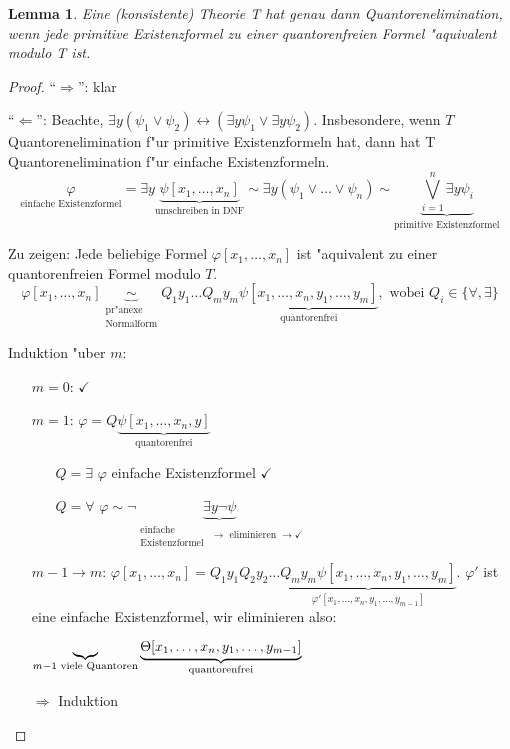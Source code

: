 \documentclass[a4paper,12pt,numbers=noenddot,parskip=full]{scrartcl}
\theoremstyle{dotless}
\newtheorem{lemma}[theorem]{Lemma}
\begin{document}
\begin{lemma}
	Eine (konsistente) Theorie T hat genau dann Quantorenelimination, wenn jede primitive Existenzformel zu einer quantorenfreien Formel "aquivalent modulo T ist.
\end{lemma}
\begin{proof}
	"`$\Rightarrow$"': klar
	
	"`$\Leftarrow$"': Beachte, $\exists y (\psi_1 \lor \psi_2) \leftrightarrow (\exists y \psi_1 \lor \exists y \psi_2)$. Insbesondere, wenn $T$ Quantorenelimination f"ur primitive Existenzformeln hat, dann hat T Quantorenelimination f"ur einfache Existenzformeln.
	\begin{equation*}
		\underset{\text{einfache Existenzformel}}{\varphi} = \exists y \underbrace{\psi[x_1, \dots, x_n]}_{\text{umschreiben in DNF}} \sim \exists y (\psi_1 \lor \dots \lor \psi_n) \sim \underbrace{\bigvee\limits^n_{i=1} \exists y \psi_i}_{\text{primitive Existenzformel}}
	\end{equation*}
	
	Zu zeigen: Jede beliebige Formel $\varphi[x_1, \dots, x_n]$ ist "aquivalent zu einer quantorenfreien Formel modulo $T$.
	\begin{equation*}
		\varphi[x_1, \dots, x_n] \underbrace{\sim}_{\substack{\text{pr"anexe}\\ \text{Normalform}}} Q_1 y_1 \dots Q_m y_m \underbrace{\psi[x_1, \dots, x_n, y_1, \dots, y_m]}_{\text{quantorenfrei}}, \text{ wobei }Q_i \in \{\forall, \exists\}
	\end{equation*}
	
	Induktion "uber $m$:
	\begin{itemize}
		\item[$m=0$:] $\checkmark$
		\item[$m=1$:] $\varphi = Q \underbrace{\psi[x_1, \dots, x_n, y]}_{\text{quantorenfrei}}$
		\begin{itemize}
			\item[$Q=\exists$] $\varphi$ einfache Existenzformel $\checkmark$
			\item[$Q=\forall$] $\varphi \sim \lnot \underbrace{\exists y \lnot \psi}_{\substack{\text{einfache}\\\text{Existenzformel }} \rightarrow \text{ eliminieren }\rightarrow \checkmark}$
		\end{itemize}
		\item[$m-1\rightarrow m$:] $\varphi[x_1, \dots, x_n]=Q_1 y_1 Q_2 y_2 \dots \underbrace{Q_m y_m \psi[x_1, \dots, x_n, y_1, \dots, y_m]}_{\varphi' [x_1, \dots, x_n, y_1, \dots, y_{m-1}]}$. $\varphi'$ ist eine einfache Existenzformel, wir eliminieren also:
		
		$\underbrace{\hfil}_{m-1 \text{ viele Quantoren}} \underbrace{\Theta[x_1, \dots, x_n, y_1, \dots, y_{m-1}]}_{\text{quantorenfrei}}$
		
		$\Rightarrow$ Induktion
	\end{itemize}

\end{proof}
\end{document}
